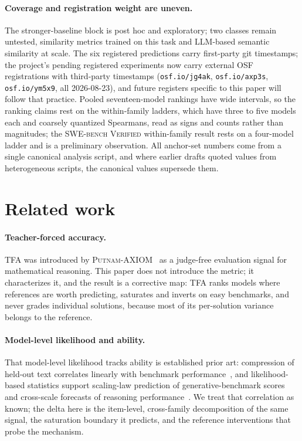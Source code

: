 \documentclass[11pt]{article}
\newcommand{\tfa}{\textsc{TFA}}
\begin{document}
\paragraph{Coverage and registration weight are uneven.}
The stronger-baseline block is post hoc and exploratory; two classes remain untested, similarity metrics trained on this task and LLM-based semantic similarity at scale.
The six registered predictions carry first-party git timestamps; the project's pending registered experiments now carry external OSF registrations with third-party timestamps (\texttt{osf.io/jg4ak}, \texttt{osf.io/axp3s}, \texttt{osf.io/ym5x9}, all 2026-08-23), and future registers specific to this paper will follow that practice.
Pooled seventeen-model rankings have wide intervals, so the ranking claims rest on the within-family ladders, which have three to five models each and coarsely quantized Spearmans, read as signs and counts rather than magnitudes; the \textsc{SWE-bench Verified} within-family result rests on a four-model ladder and is a preliminary observation.
All anchor-set numbers come from a single canonical analysis script, and where earlier drafts quoted values from heterogeneous scripts, the canonical values supersede them.

\section{Related work}
\label{sec:related}

\paragraph{Teacher-forced accuracy.}
\tfa{} was introduced by \textsc{Putnam-AXIOM}~\cite{gulati2025putnam} as a judge-free evaluation signal for mathematical reasoning.
This paper does not introduce the metric; it characterizes it, and the result is a corrective map: \tfa{} ranks models where references are worth predicting, saturates and inverts on easy benchmarks, and never grades individual solutions, because most of its per-solution variance belongs to the reference.

\paragraph{Model-level likelihood and ability.}
That model-level likelihood tracks ability is established prior art: compression of held-out text correlates linearly with benchmark performance~\cite{huang2024compression}, and likelihood-based statistics support scaling-law prediction of generative-benchmark scores~\cite{schaeffer2025pretraining} and cross-scale forecasts of reasoning performance~\cite{koh2025rbridge}.
We treat that correlation as known; the delta here is the item-level, cross-family decomposition of the same signal, the saturation boundary it predicts, and the reference interventions that probe the mechanism.
\end{document}
